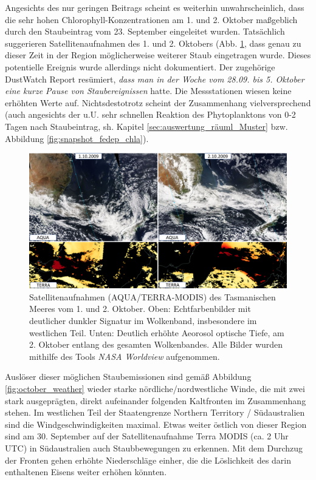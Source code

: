 \documentclass[12pt,a4paper,onecolumn]{scrartcl}
\begin{document}
Angesichts des nur geringen Beitrags scheint es weiterhin unwahrscheinlich, dass die sehr hohen Chlorophyll-Konzentrationen am 1. und 2. Oktober maßgeblich durch den Staubeintrag vom 23. September eingeleitet wurden. Tatsächlich suggerieren Satellitenaufnahmen des 1. und 2. Oktobers (Abb. \ref{fig:satellite_october}, dass genau zu dieser Zeit in der Region möglicherweise weiterer Staub eingetragen wurde. Dieses potentielle Ereignis wurde allerdings nicht dokumentiert. Der zugehörige DustWatch Report \citep{Leys.2009b} resümiert, \textit{dass man in der Woche vom 28.09. bis 5. Oktober eine kurze Pause von Staubereignissen} hatte. Die Messstationen wiesen keine erhöhten Werte auf. Nichtsdestotrotz scheint der Zusammenhang vielversprechend (auch angesichts der u.U. sehr schnellen Reaktion des Phytoplanktons von 0-2 Tagen nach Staubeintrag, sh. Kapitel \ref{sec:auswertung_räuml_Muster} bzw. Abbildung \ref{fig:snapshot_fedep_chla}).
\begin{figure}
\includegraphics[width=\textwidth]{bilder/satellite_october.png}
\caption{Satellitenaufnahmen (AQUA/TERRA-MODIS) des Tasmanischen Meeres vom 1. und 2. Oktober. Oben: Echtfarbenbilder mit deutlicher dunkler Signatur im Wolkenband, insbesondere im westlichen Teil. Unten: Deutlich erhöhte Aeorosol optische Tiefe, am 2. Oktober entlang des gesamten Wolkenbandes. Alle Bilder wurden mithilfe des Tools \textit{NASA Worldview} aufgenommen.} \label{fig:satellite_october}
\end{figure}
Auslöser dieser möglichen Staubemissionen sind gemäß Abbildung \ref{fig:october_weather} wieder starke nördliche/nordwestliche Winde, die mit zwei stark ausgeprägten, direkt aufeinander folgenden Kaltfronten im Zusammenhang stehen. Im westlichen Teil der Staatengrenze Northern Territory / Südaustralien sind die Windgeschwindigkeiten maximal. Etwas weiter östlich von dieser Region sind am 30. September auf der Satellitenaufnahme Terra MODIS (ca. 2 Uhr UTC) in Südaustralien auch Staubbewegungen zu erkennen. Mit dem Durchzug der Fronten gehen erhöhte Niederschläge einher, die die Löslichkeit des darin enthaltenen Eisens weiter erhöhen könnten. 
\end{document}
